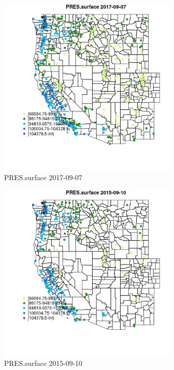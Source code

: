 \begin{figure} 
\centering  
\includegraphics[width=0.77\textwidth]{Code_Outputs/Report_ML_input_PM25_Step4_part_e_de_duplicated_aves_compiled_2019-05-21wNAs_MapObsPRESsurface2017-09-07.jpg} 
\caption{\label{fig:Report_ML_input_PM25_Step4_part_e_de_duplicated_aves_compiled_2019-05-21wNAsMapObsPRESsurface2017-09-07}PRES.surface 2017-09-07} 
\end{figure} 
 

\begin{figure} 
\centering  
\includegraphics[width=0.77\textwidth]{Code_Outputs/Report_ML_input_PM25_Step4_part_e_de_duplicated_aves_compiled_2019-05-21wNAs_MapObsPRESsurface2015-09-10.jpg} 
\caption{\label{fig:Report_ML_input_PM25_Step4_part_e_de_duplicated_aves_compiled_2019-05-21wNAsMapObsPRESsurface2015-09-10}PRES.surface 2015-09-10} 
\end{figure} 
 

